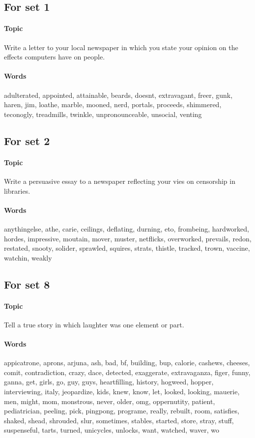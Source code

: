 \documentclass[a4paper,12pt,english]{article}
\begin{document}
\subsection{For set 1}
\paragraph{Topic} Write a letter to your local newspaper in which you state your opinion on the effects computers have on people.
\paragraph{Words}
adulterated, appointed, attainable, beards, doesnt, extravagant, 
freer, gunk, haren, jim, loathe, marble, mooned, nerd, 
portals, proceeds, shimmered, teconogly, treadmills, twinkle, unpronounceable, unsocial, venting

\subsection{For set 2}
\paragraph{Topic} Write a persuasive essay to a newspaper reflecting your vies on censorship in libraries.

\paragraph{Words}
anythingelse, athe, carie, ceilings, deflating, durning, eto, frombeing, hardworked, hordes, impressive, moutain, mover, muster, netflicks, overworked, prevails, redon, restated, snooty, solider, sprawled, squires, strats, thistle, tracked, trown, vaccine, watchin, weakly

\subsection{For set 8}
\paragraph{Topic} Tell a true story in which laughter was one element or part.
\paragraph{Words}
appicatrone, aprons, arjuna, ash, bad, bf, building, bup, calorie, cashews, cheeses, comit, contradiction, crazy, dace, detected, exaggerate, extravaganza, figer, funny, ganna, get, girls, go, guy, guys, heartfilling, history, hogweed, hopper,  interviewing, italy, jeopardize, kids, knew, know, let, looked, looking, mauerie, men, might, mom, monstrous, never, older, omg, oppernutity, patient, pediatrician, peeling, pick, pingpong, programe, really, rebuilt, room, satisfies, shaked, shead, shrouded, slur, sometimes, stables, started, store, stray, stuff, suspenseful, tarts, turned, unicycles, unlocks, want, watched, waver, wo


 

\end{document}
